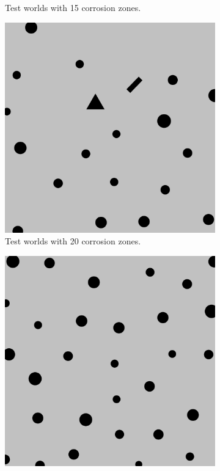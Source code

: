 \begin{theappendices}
\begin{figure}[H]
\begin{subfigure}[t]{\linewidth}
				\caption{Test worlds with 15 corrosion zones.}
				\label{fig:test_model_15_5}
			\end{subfigure}
			\hfill
			\begin{subfigure}[t]{0.15\linewidth}
				\centering
				\includegraphics[width=\linewidth]{graphics/test_model_20_1.png}
				\caption{Test worlds with 20 corrosion zones.}
				\label{fig:test_model_20_1}
			\end{subfigure}
			\hfill
			\begin{subfigure}[t]{0.15\linewidth}
				\centering
				\includegraphics[width=\linewidth]{graphics/test_model_30_1.png}

\end{subfigure}
\end{figure}
\end{theappendices}
